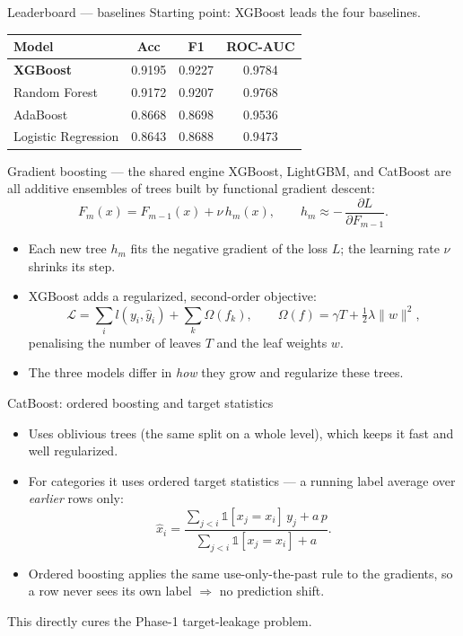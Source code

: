 \documentclass[aspectratio=169]{beamer}
\begin{document}
\begin{frame}{Leaderboard --- baselines}
\footnotesize
Starting point: XGBoost leads the four baselines.
\vspace{0.25cm}
\begin{center}
\begin{tabular}{lccc}
\toprule
\textbf{Model} & \textbf{Acc} & \textbf{F1} & \textbf{ROC-AUC} \\
\midrule
\rowcolor{accent!18}\textbf{XGBoost} & 0.9195 & 0.9227 & 0.9784 \\
Random Forest & 0.9172 & 0.9207 & 0.9768 \\
AdaBoost & 0.8668 & 0.8698 & 0.9536 \\
Logistic Regression & 0.8643 & 0.8688 & 0.9473 \\
\bottomrule
\end{tabular}
\end{center}
\end{frame}

\begin{frame}{Gradient boosting --- the shared engine}
\small
XGBoost, LightGBM, and CatBoost are all additive ensembles of trees built by
functional gradient descent:
\[
F_m(x)=F_{m-1}(x)+\nu\,h_m(x),\qquad h_m \approx -\,\frac{\partial L}{\partial F_{m-1}}.
\]
\begin{itemize}
    \item Each new tree $h_m$ fits the negative gradient of the loss $L$;
          the learning rate $\nu$ shrinks its step.
    \item XGBoost adds a regularized, second-order objective:
    \[
    \mathcal{L}=\sum_i l(y_i,\hat{y}_i)+\sum_k \Omega(f_k),\qquad
    \Omega(f)=\gamma T+\tfrac12\lambda\lVert w\rVert^2 ,
    \]
    penalising the number of leaves $T$ and the leaf weights $w$.
    \item The three models differ in \emph{how} they grow and regularize these trees.
\end{itemize}
\end{frame}

\begin{frame}{CatBoost: ordered boosting and target statistics}
\small
\begin{itemize}
    \item Uses oblivious trees (the same split on a whole level), which keeps it
          fast and well regularized.
    \item For categories it uses ordered target statistics --- a running label
          average over \emph{earlier} rows only:
    \[
    \hat{x}_i=\frac{\sum_{j<i}\mathbb{1}[x_j=x_i]\,y_j+a\,p}{\sum_{j<i}\mathbb{1}[x_j=x_i]+a}.
    \]
    \item Ordered boosting applies the same use-only-the-past rule to the
          gradients, so a row never sees its own label $\Rightarrow$ no prediction shift.
\end{itemize}
\vspace{0.1cm}
{\footnotesize This directly cures the Phase-1 target-leakage problem.}
\end{frame}
\end{document}
